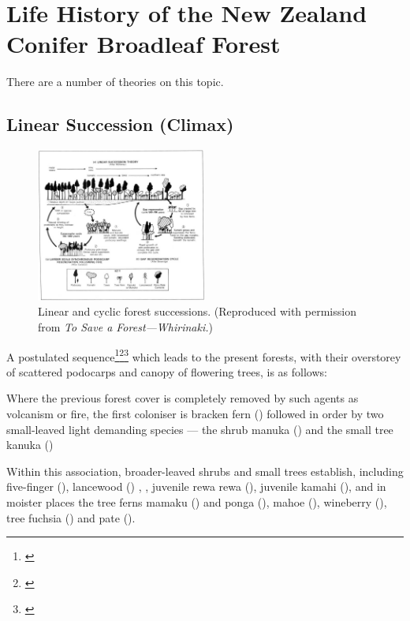 \section{Life History of the New Zealand Conifer Broadleaf Forest}

There are a number of theories on this topic.

\subsection[Linear Succession (Climax)]{Linear Succession (Climax)}

\begin{figure}
	\includegraphics[width=0.5\textwidth]{graphics/figure64forestsuccession.jpg}
	\centering
	\caption[Linear and cyclic forest successions]{Linear and cyclic forest successions. (Reproduced with permission from \emph{To Save a Forest---Whirinaki.})}%
	\label{fig:64forestsuccession}
\end{figure}

A postulated sequence\footnote{\cite{cockayne1928vegetation}}\footnote{\cite{mckelvey1963synecology}}\footnote{\cite{mckelvey1973pattern}} which leads to the present forests, with their overstorey of scattered podocarps and canopy of flowering trees, is as follows:

Where the previous forest cover is completely removed by such agents as volcanism or fire, the first coloniser is bracken fern () followed in order by two small-leaved light demanding species --- the shrub manuka () and the small tree kanuka ()

Within this association, broader-leaved shrubs and small trees establish, including five-finger (), lancewood () , , juvenile rewa rewa (), juvenile kamahi (), and in moister places the tree ferns mamaku () and ponga (), mahoe (), wineberry (), tree fuchsia () and pate ().

